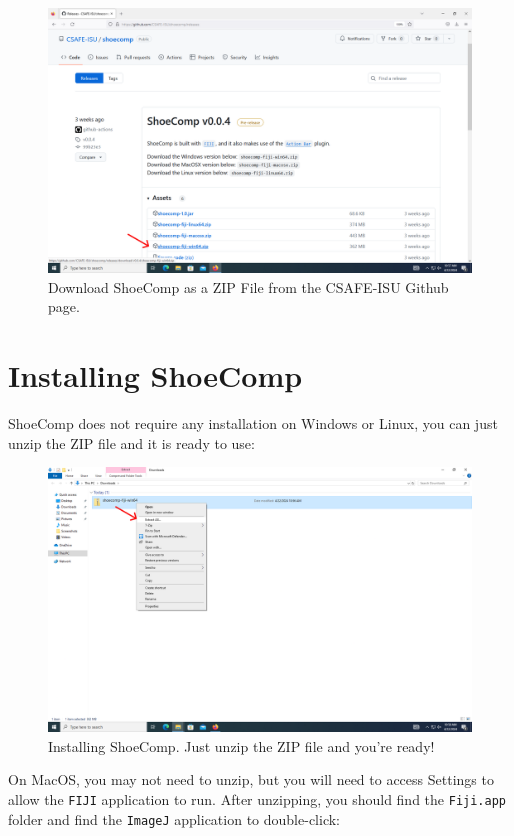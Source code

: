 \documentclass{csafedoc}
\begin{document}
\begin{figure}[htbp]
	\begin{center}
		\includegraphics[width=0.8\linewidth]{images/step_1-anno.png}
	\end{center}
	\caption{Download ShoeComp as a ZIP File from the CSAFE-ISU Github page.}
	\label{fig:step1}
\end{figure}

\section{Installing ShoeComp}

ShoeComp does not require any installation on Windows or Linux, you can just unzip the ZIP
file and it is ready to use:

\begin{figure}[H]
	\begin{center}
		\includegraphics[width=0.8\linewidth]{images/step_2-anno.png}
	\end{center}
	\caption{Installing ShoeComp. Just unzip the ZIP file and you're ready!}
	\label{fig:step2}
\end{figure}

On MacOS, you may not need to unzip, but you will need to access Settings to allow the
\texttt{FIJI} application to run. After unzipping, you should find the \texttt{Fiji.app}
folder and find the \texttt{ImageJ} application to double-click:
\end{document}
